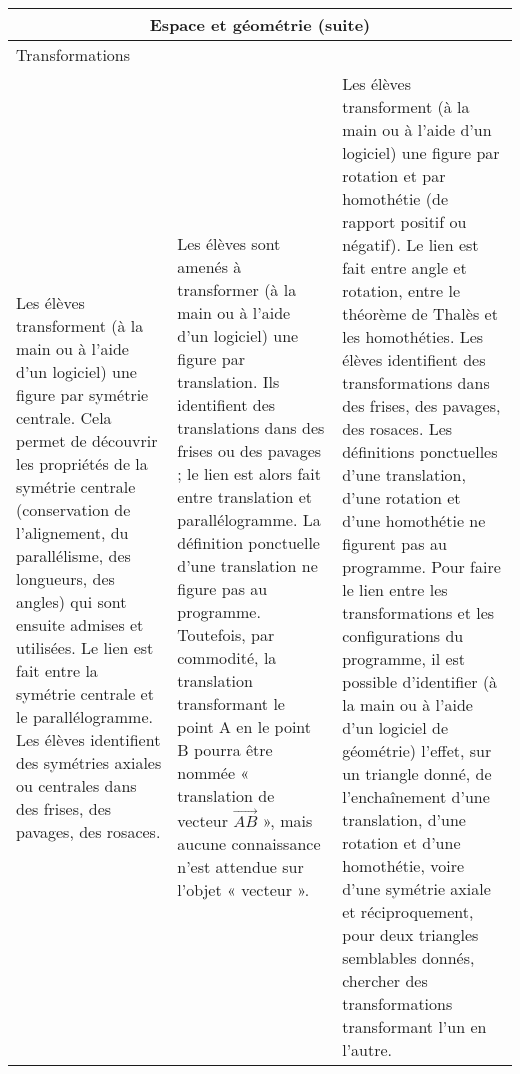\documentclass[11pt]{article}
\newcommand{\categorie}[1]{\hline\multicolumn{3}{|c|}{\color{white}\LARGE\cellcolor{bleu}\sffamily\phantom{É} #1 \phantom{É}}\rmfamily \\\hline}
\newcommand{\note}[1]{\hline\multicolumn{3}{|p{18.6cm}|}{#1} \\ \hline}
\newenvironment{programme}
{
    \setlength{\arrayrulewidth}{0.5pt}
    \arrayrulecolor{bleu}
    \begin{center}
    \begin{tabular}{|p{6.4cm}|p{6.4cm}|p{6.4cm}|}
}
{
    \hline
    \end{tabular}
    \end{center}
}
\begin{document}
\begin{programme}
    \categorie{Espace et géométrie (suite)}
    \note{Transformations}
    Les élèves transforment (à la main ou à l’aide d’un logiciel) une figure par symétrie centrale. Cela permet de découvrir les propriétés de la symétrie centrale (conservation de l’alignement, du parallélisme, des longueurs, des angles) qui sont ensuite admises et utilisées. Le lien est fait entre la symétrie centrale et le parallélogramme. Les élèves identifient des symétries axiales ou centrales dans des frises, des pavages, des rosaces. & Les élèves sont amenés à transformer (à la main ou à l’aide d’un logiciel) une figure par translation. Ils identifient des translations dans des frises ou des pavages ; le lien est alors fait entre translation et parallélogramme. La définition ponctuelle d’une translation ne figure pas au programme. Toutefois, par commodité, la translation transformant le point A en le point B pourra être nommée « translation de vecteur $\vec{AB}$ », mais aucune connaissance n’est attendue sur l’objet « vecteur ». & Les élèves transforment (à la main ou à l’aide d’un logiciel) une figure par rotation et par homothétie (de rapport positif ou négatif). Le lien est fait entre angle et rotation, entre le théorème de Thalès et les homothéties. Les élèves identifient des transformations dans des frises, des pavages, des rosaces. Les définitions ponctuelles d’une translation, d’une rotation et d’une homothétie ne figurent pas au programme. Pour faire le lien entre les transformations et les configurations du programme, il est possible d’identifier (à la main ou à l’aide d’un logiciel de géométrie) l’effet, sur un triangle donné, de l’enchaînement d’une translation, d’une rotation et d’une homothétie, voire d’une symétrie axiale et réciproquement, pour deux triangles semblables donnés, chercher des transformations transformant l’un en l’autre. \\
\end{programme}
\end{document}
